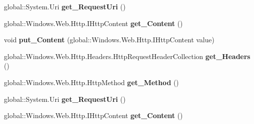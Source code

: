 \begin{DoxyCompactItemize}
\item 
\mbox{\label{interface_windows_1_1_web_1_1_http_1_1_i_http_request_message_ace91874a34280b89ed6f4237fc3806df}} 
global\+::\+System.\+Uri {\bfseries get\+\_\+\+Request\+Uri} ()
\item 
\mbox{\label{interface_windows_1_1_web_1_1_http_1_1_i_http_request_message_a841ab70a054baf88551bb2a7b5d82d84}} 
global\+::\+Windows.\+Web.\+Http.\+I\+Http\+Content {\bfseries get\+\_\+\+Content} ()
\item 
\mbox{\label{interface_windows_1_1_web_1_1_http_1_1_i_http_request_message_a4bd07841801d3cdf596e41166635fe08}} 
void {\bfseries put\+\_\+\+Content} (global\+::\+Windows.\+Web.\+Http.\+I\+Http\+Content value)
\item 
\mbox{\label{interface_windows_1_1_web_1_1_http_1_1_i_http_request_message_a673256b5835bfd09b1edd689fb5333ad}} 
global\+::\+Windows.\+Web.\+Http.\+Headers.\+Http\+Request\+Header\+Collection {\bfseries get\+\_\+\+Headers} ()
\item 
\mbox{\label{interface_windows_1_1_web_1_1_http_1_1_i_http_request_message_a91a5d1f2da9e595f9d1b6c72e674d3dc}} 
global\+::\+Windows.\+Web.\+Http.\+Http\+Method {\bfseries get\+\_\+\+Method} ()
\item 
\mbox{\label{interface_windows_1_1_web_1_1_http_1_1_i_http_request_message_ace91874a34280b89ed6f4237fc3806df}} 
global\+::\+System.\+Uri {\bfseries get\+\_\+\+Request\+Uri} ()
\item 
\mbox{\label{interface_windows_1_1_web_1_1_http_1_1_i_http_request_message_a841ab70a054baf88551bb2a7b5d82d84}} 
global\+::\+Windows.\+Web.\+Http.\+I\+Http\+Content {\bfseries get\+\_\+\+Content} ()
\item 
\mbox{\label{interface_windows_1_1_web_1_1_http_1_1_i_http_request_message_a4bd07841801d3cdf596e41166635fe08}} 

\end{DoxyCompactItemize}
